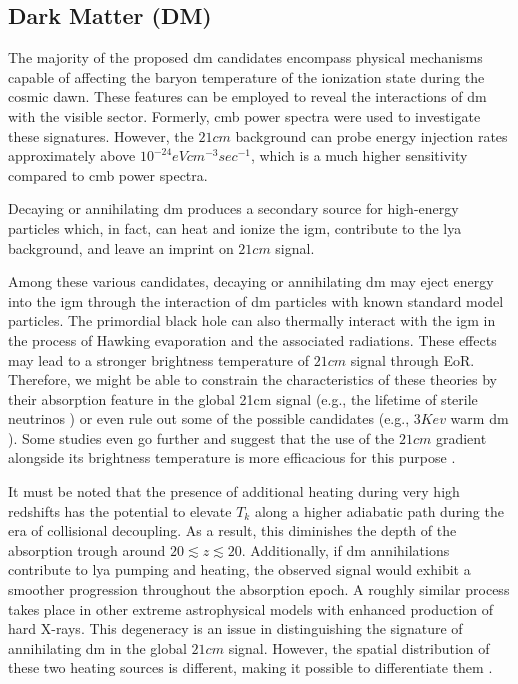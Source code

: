 \documentclass[12pt, TexShade, letterpaper]{report}
\begin{document}
\subsection{Dark Matter (DM)}
The majority of the proposed \gls{dm} candidates encompass physical mechanisms capable of affecting the baryon temperature of the ionization state during the cosmic dawn. These features can be employed to reveal the interactions of \gls{dm} with the visible sector. Formerly, \gls{cmb} power spectra were used to investigate these signatures. However, the $21cm$ background can probe energy injection rates approximately above $10^{-24}eV cm^{-3} sec^{-1}$, which is a much higher sensitivity compared to \gls{cmb} power spectra.\par
Decaying or annihilating \gls{dm} produces a secondary source for high-energy particles which, in fact, can heat and ionize the \gls{igm}, contribute to the \gls{lya} background, and leave an imprint on $21cm$ signal. \par
Among these various candidates, decaying or annihilating \gls{dm} may eject energy into the \gls{igm} through the interaction of \gls{dm} particles with known standard model particles. The primordial black hole can also thermally interact with the \gls{igm} in the process of Hawking evaporation and the associated radiations. These effects may lead to a stronger brightness temperature of $21cm$ signal through EoR.  Therefore, we might be able to constrain the characteristics of these theories by their absorption feature in the global 21cm signal (e.g., the lifetime of sterile neutrinos \cite{sterile_neutrino}) \cite{primordial_bh, new_physics_thesis, primordial_bh_binary, 21limit_dm_bh, bound_dm} or even rule out some of the possible candidates (e.g., $3 Kev$ warm \gls{dm} \cite{rule_out}). Some studies even go further and suggest that the use of the $21cm$ gradient alongside its brightness temperature is more efficacious for this purpose \cite{DM_anihilation_furlantto, constrain_dm_21, DM_anihilation_1, DM_ionize, dark_cosmology_21, snowmass_dm}.\par

It must be noted that the presence of additional heating during very high redshifts has the potential to elevate $T_k$ along a higher adiabatic path during the era of collisional decoupling. As a result, this diminishes the depth of the absorption trough around $20 \lesssim z \lesssim 20$. Additionally, if \gls{dm} annihilations contribute to \gls{lya} pumping and heating, the observed signal would exhibit a smoother progression throughout the absorption epoch. A roughly similar process takes place in other extreme astrophysical models with enhanced production of hard X-rays. This degeneracy is an issue in distinguishing the signature of annihilating \gls{dm} in the global $21cm$ signal. However, the spatial distribution of these two heating sources is different, making it possible to differentiate them \cite{dark_nature_21}. \par
\end{document}
